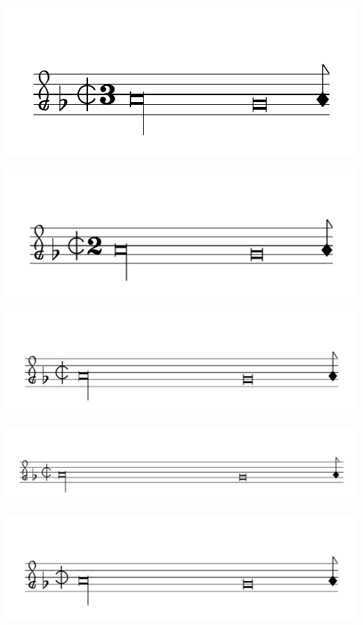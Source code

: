 \documentclass{article}
\begin{document}
        \includegraphics[scale=0.5]{figures_tests/pdf/smens/commonmeter3.pdf}

        \includegraphics[scale=0.5]{figures_tests/pdf/smens/commonmeter4.pdf}

        \includegraphics[scale=0.5]{figures_tests/pdf/smens/commonmeter5.pdf}

        \includegraphics[scale=0.5]{figures_tests/pdf/smens/commonmeter6.pdf}

        \includegraphics[scale=0.5]{figures_tests/pdf/smens/commonmeter8.pdf}
\end{document}
